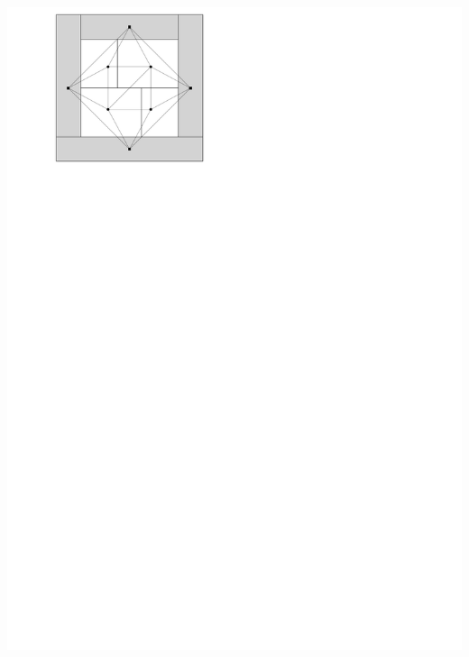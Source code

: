 \documentclass[a4paper]{article}
\begin{document}
\includegraphics[scale=.3]{./introduction/img/caDual.pdf}
\clearpage%
\end{document}
